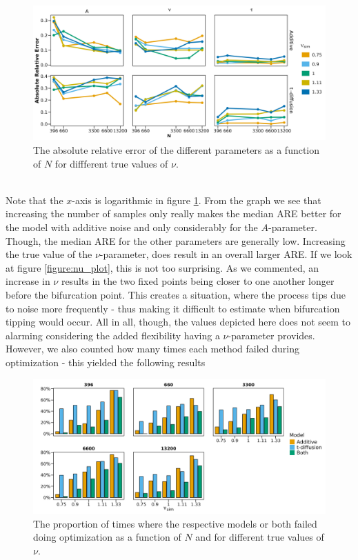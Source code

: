 \begin{figure}[h!]
    \begin{center}
        \includegraphics[scale = .1]{figures/combined_nus_plot.jpeg}
        \caption{The absolute relative error of the different parameters as a function of $N$ for diffferent true values of $\nu$.}
        \label{figure:ARE_nu_plots}
    \end{center}
\end{figure}\\
Note that the $x$-axis is logarithmic in figure \ref{figure:ARE_nu_plots}. From the graph we see that increasing the number of samples only really makes the median ARE better for the model with additive noise and only considerably for the $A$-parameter. Though, the median ARE for the other parameters are generally low. Increasing the true value of the $\nu$-parameter, does result in an overall larger ARE. If we look at figure \ref{figure:nu_plot}, this is not too surprising. As we commented, an increase in $\nu$ results in the two fixed points being closer to one another longer before the bifurcation point. This creates a situation, where the process tips due to noise more frequently - thus making it difficult to estimate when bifurcation tipping would occur. All in all, though, the values depicted here does not seem to alarming considering the added flexibility having a $\nu$-parameter provides. However, we also counted how many times each method failed during optimization - this yielded the following results
\begin{figure}[h!]
    \begin{center}
        \includegraphics[scale = .1]{figures/error_count_plot.jpeg}
        \caption{The proportion of times where the respective models or both failed doing optimization as a function of $N$ and for different true values of $\nu$.}
        \label{figure:error_count_nu_experiment}
    \end{center}
\end{figure}
